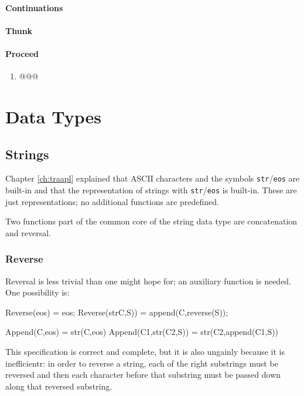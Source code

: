 \documentclass[11pt,twoside]{memoir}
\def\T{\texttt}
\begin{document}
\subsubsection{Continuations}
\subsubsection{Thunk}
\subsubsection{Proceed}
\begin{enumerate}
	\item  @@@
\end{enumerate}





















\chapter{Data Types}
\label{ch:dt}
\section{Strings}

Chapter \ref{ch:traapl} explained that ASCII characters and the symbols \T{str}/\T{eos} are built-in and that the representation of strings with \T{str}/\T{eos} is built-in. These are just representations; no additional functions are predefined. 

Two functions part of the common core of the string data type are concatenation and reversal.

\subsection{Reverse}
Reversal is less trivial than one might hope for; an auxiliary function is needed. One possibility is:

Reverse(eos) = eos;
Reverse(strC,S)) = append(C,reverse(S));

Append(C,eos) = str(C,eos)
Append(C1,str(C2,S)) = str(C2,append(C1,S))

This specification is correct and complete, but it is also ungainly because it is inefficientr: in order to reverse a string, each of the right substrings must be reversed and then each character before that substring must be passed down along that reversed substring.
\end{document}

